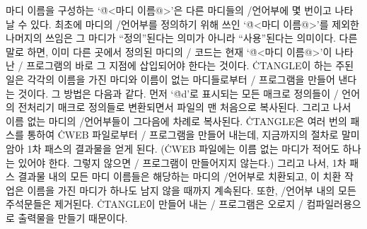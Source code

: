 마디 이름을 구성하는 `\.{@<마디 이름@>}'은 다른 마디들의 \CEE/언어부에
몇 번이고 나타날 수 있다. 최초에 마디의 \CEE/언어부를 정의하기 위해
쓰인 `\.{@<마디 이름@>}'를 제외한 나머지의 쓰임은 그 마디가
``정의''된다는 의미가 아니라 ``사용''된다는 의미이다. 다른 말로 하면,
이미 다른 곳에서 정의된 마디의 \CEE/ 코드는 현재 `\.{@<마디 이름@>}'이
나타난 \CEE/ 프로그램의 바로 그 지점에 삽입되어야 한다는
것이다. \.{CTANGLE}이 하는 주된 일은 각각의 이름을 가진 마디와 이름이
없는 마디들로부터 \CEE/ 프로그램을 만들어 낸다는 것이다. 그 방법은 다음과 같다.
먼저 `\.{@d}'로 표시되는 모든 매크로 정의들이 \CEE/ 언어의
전처리기 매크로 정의들로 변환되면서 파일의 맨 처음으로 복사된다. 그리고
나서 이름 없는 마디의 \CEE/언어부들이 그다음에 차례로 복사된다.
\.{CTANGLE}은 여러 번의 패스를 통하여 \.{CWEB} 파일로부터 \CEE/
프로그램을 만들어 내는데, 지금까지의 절차로 말미암아 1차 패스의 결과물을
얻게 된다. (\.{CWEB} 파일에는 이름 없는 마디가 적어도 하나는 있어야
한다. 그렇지 않으면 \CEE/ 프로그램이 만들어지지 않는다.) 그리고 나서,
1차 패스 결과물 내의 모든 마디 이름들은 해당하는 마디의 \CEE/언어부로
치환되고, 이 치환 작업은 이름을 가진 마디가 하나도 남지 않을 때까지
계속된다. 또한, \CEE/언어부 내의 모든 주석문들은 제거된다. \.{CTANGLE}이 
만들어 내는 \CEE/ 프로그램은 오로지 \CEE/ 컴파일러용으로 출력물을 만들기
때문이다.

